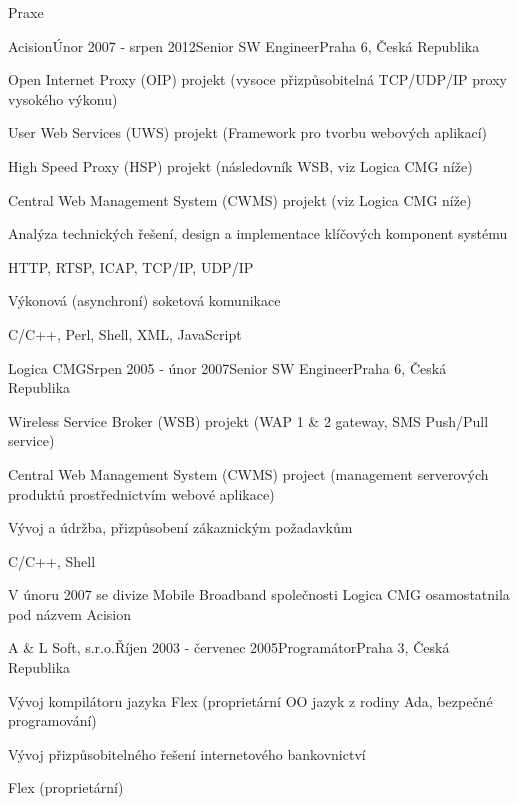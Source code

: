 \documentclass{resume} %
\begin{document}
\begin{rSection}{Praxe}
\begin{rSubsection}{Acision}{\'{U}nor 2007 - srpen 2012}{Senior SW Engineer}{Praha 6, \v{C}esk\'{a} Republika}
\item Open Internet Proxy (OIP) projekt (vysoce p\v{r}izp\r{u}sobiteln\'{a} TCP/UDP/IP proxy vysok\'{e}ho v\'{y}konu)
\item User Web Services (UWS) projekt (Framework pro tvorbu webov\'{y}ch aplikac\'{i})
\item High Speed Proxy (HSP) projekt (n\'{a}sledovn\'{i}k WSB, viz Logica CMG n\'{i}\v{z}e)
\item Central Web Management System (CWMS) projekt (viz Logica CMG n\'{i}\v{z}e)
\item Anal\'{y}za technick\'{y}ch \v{r}e\v{s}en\'{i}, design a implementace kl\'{i}\v{c}ov\'{y}ch komponent syst\'{e}mu
\item HTTP, RTSP, ICAP, TCP/IP, UDP/IP
\item V\'{y}konov\'{a} (asynchron\'{i}) soketov\'{a} komunikace
\item C/C++, Perl, Shell, XML, JavaScript
\end{rSubsection}


\begin{rSubsection}{Logica CMG}{Srpen 2005 - \'{u}nor 2007}{Senior SW Engineer}{Praha 6, \v{C}esk\'{a} Republika}
\item Wireless Service Broker (WSB) projekt (WAP 1 \& 2 gateway, SMS Push/Pull service)
\item Central Web Management System (CWMS) project (management serverov\'{y}ch produkt\r{u} prost\v{r}ednictv\'{i}m webov\'{e} aplikace)
\item V\'{y}voj a \'{u}dr\v{z}ba, p\v{r}izp\r{u}soben\'{i} z\'{a}kaznick\'{y}m po\v{z}adavk\r{u}m
\item C/C++, Shell
\item V \'{u}noru 2007 se divize Mobile Broadband spole\v{c}nosti Logica CMG osamostatnila pod n\'{a}zvem Acision
\end{rSubsection}


\begin{rSubsection}{A \& L Soft, s.r.o.}{\v{R}\'{i}jen 2003 - \v{c}ervenec 2005}{Program\'{a}tor}{Praha 3, \v{C}esk\'{a} Republika}
\item V\'{y}voj kompil\'{a}toru jazyka Flex (propriet\'{a}rn\'{i} OO jazyk z rodiny Ada, bezpe\v{c}n\'{e} programov\'{a}n\'{i})
\item V\'{y}voj p\v{r}izp\r{u}sobiteln\'{e}ho \v{r}e\v{s}en\'{i} internetov\'{e}ho bankovnictv\'{i}
\item Flex (propriet\'{a}rn\'{i})
\end{rSubsection}

\end{rSection}
\end{document}
